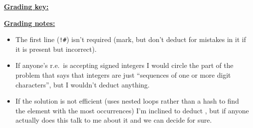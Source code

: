 \documentclass[11pt,fleqn]{article}
\begin{document}
\begin{enumerate}
\begin{info}{\textbf{\underline{Grading key:}}}
\begin{itemize}
            \end{itemize}

          \end{info}

          \begin{info}{\textbf{\underline{Grading notes:}}}

            \smallskip

            \begin{itemize}

              \addtolength{\itemsep}{1mm}

              \item The first line (\texttt{!\#}) isn't required (mark, but
                    don't deduct for mistakes in it if it is present but
                    incorrect).

              \item If anyone's r.e.\ is accepting signed integers I would
                    circle the part of the problem that says that integers
                    are just ``sequences of one or more digit characters'',
                    but I wouldn't deduct anything.

              \item If the solution is not efficient (uses nested loops
                    rather than a hash to find the element with the most
                    occurrences) I'm inclined to deduct , but if
                    anyone actually does this talk to me about it and we can
                    decide for sure.

            \end{itemize}

          \end{info}


  \end{enumerate}
\end{document}
